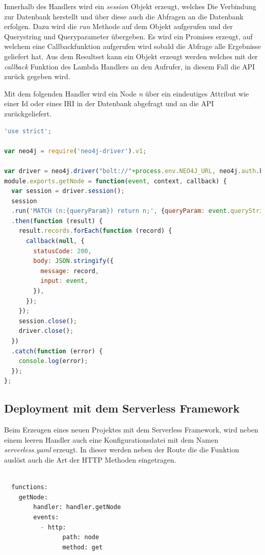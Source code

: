 Innerhalb des Handlers wird ein \textit{session} Objekt erzeugt, welches Die Verbindung zur Datenbank herstellt und über diese auch die Abfragen an die Datenbank erfolgen. Dazu wird die \textit{run} Methode auf dem Objekt aufgerufen und der Querystring und Queryparameter übergeben. Es wird ein Promises erzeugt, auf welchem eine Callbackfunktion aufgerufen wird sobald die Abfrage alle Ergebnisse geliefert hat. Aus dem Resultset kann ein Objekt erzeugt werden welches mit der \textit{callback} Funktion des Lambda Handlers an den Aufrufer, in diesem Fall die API zurück gegeben wird.

Mit dem folgenden Handler wird ein Node \textit{n} über ein eindeutiges Attribut wie einer Id oder eines IRI in der Datenbank abgefragt und an die API zurückgeliefert.


\begin{lstlisting}[language=JavaScript, frame=htrbl, caption={Lambda Handler Funktion}, label={lst:lambda_handler}]
	'use strict';

var neo4j = require('neo4j-driver').v1;

var driver = neo4j.driver("bolt://"+process.env.NEO4J_URL, neo4j.auth.basic("user" ,"password"));
module.exports.getNode = function(event, context, callback) {
  var session = driver.session();
  session
  .run('MATCH (n:{queryParam}) return n;', {queryParam: event.queryStringParameters.label})
  .then(function (result) {
    result.records.forEach(function (record) {
      callback(null, {
        statusCode: 200,
        body: JSON.stringify({
          message: record,
          input: event,
        }),
      });
    });
    session.close();
    driver.close();
  })
  .catch(function (error) {
    console.log(error);
  });
};


\end{lstlisting}


\subsection{Deployment mit dem Serverless Framework}

Beim Erzeugen eines neuen Projektes mit dem Serverless Framework, wird neben einem leeren Handler auch eine Konfigurationsdatei mit dem Namen \textit{serverless.yaml} erzeugt. In dieser werden neben der Route die die Funktion auslöst auch die Art der HTTP Methoden eingetragen.

\begin{lstlisting}[language=Python, frame=htrbl, caption={Serverless Konfiguration}, label={lst:serverless_yaml}]

  functions:
  	getNode:
    	handler: handler.getNode
    	events: 
          - http: 
            	path: node 
         		method: get 
         		
\end{lstlisting}

